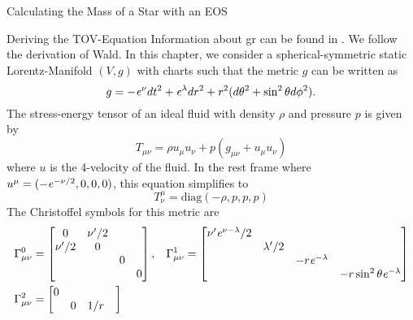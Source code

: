 \begin{section}{Calculating the Mass of a Star with an EOS}
\begin{subsection}{Deriving the TOV-Equation}
\label{3-Mass-TOVDerivation}
Information about \ac{gr} can be found in \cite{choquet-bruhatAnalysisManifoldsPhysics2000, choquet-bruhatGeneralRelativityEinstein2009, choquet-bruhatIntroductionGeneralRelativity2015, waldGeneralRelativity1984}.
We follow the derivation of Wald.
In this chapter, we consider a spherical-symmetric static Lorentz-Manifold $(V,g)$ with charts such that the metric $g$ can be written as
\begin{equation}
	g=-\mathit{e}^\nu dt^2+\mathit{e}^\lambda dr^2 + r^2(d\theta^2+\sin^2\theta d\phi^2).
\end{equation}
The stress-energy tensor of an ideal fluid with density $\rho$ and pressure $p$ is given by
\begin{equation}
	T_{\mu\nu}=\rho u_\mu u_\nu + p(g_{\mu\nu}+u_\mu u_\nu)
\end{equation}
where $u$ is the 4-velocity of the fluid. In the rest frame where $u^\mu=(-\mathit{e}^{-\nu/2},0,0,0)$, this equation simplifies to
\begin{equation}
	T^\mu_\nu=\text{diag}(-\rho,p,p,p)
\end{equation}
The Christoffel symbols for this metric are
\begin{align}
	\Gamma_{\mu\nu}^0 &= \begin{bmatrix}
	                     	0 & \nu'/2 & & \\
	                     	\nu'/2 & 0 & & \\
	                     	& & 0 &\\
	                     	& & & 0
	                     \end{bmatrix}, \hspace{0.3cm}
	\Gamma_{\mu\nu}^1 = \begin{bmatrix}
	                     	\nu'\mathit{e}^{\nu-\lambda}/2 & & &\\
	                     	& \lambda'/2 & & \\
	                     	& & -r\mathit{e}^{-\lambda} & \\
	                     	& & & -r\sin^2\theta\mathit{e}^{-\lambda}
	                     \end{bmatrix}\\
	\Gamma_{\mu\nu}^2 &= \begin{bmatrix}
	                     	0 & & &\\
	                     	& 0 & 1/r &\\

\end{bmatrix}
\end{align}
\end{subsection}
\end{section}
